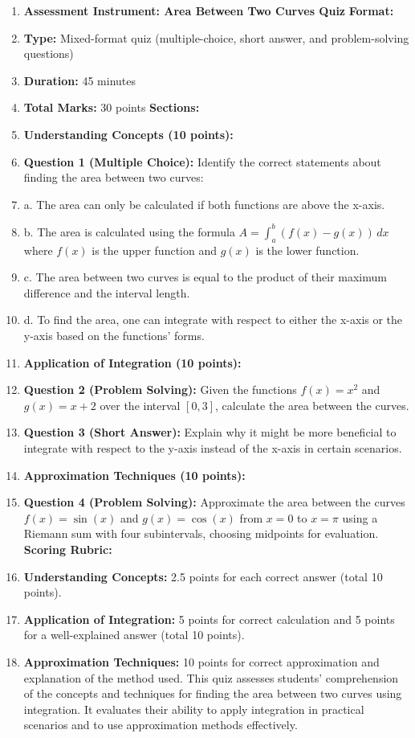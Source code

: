 \begin{enumerate}
    \item \textbf{Assessment Instrument: Area Between Two Curves Quiz} \textbf{Format:}
    \item \textbf{Type:} Mixed-format quiz (multiple-choice, short answer, and problem-solving questions)
    \item \textbf{Duration:} 45 minutes
    \item \textbf{Total Marks:} 30 points \textbf{Sections:}
    \item \textbf{Understanding Concepts (10 points):}
    \item \textbf{Question 1 (Multiple Choice):} Identify the correct statements about finding the area between two curves:
    \item a. The area can only be calculated if both functions are above the x-axis.
    \item b. The area is calculated using the formula $A = \int_a^b (f(x) - g(x)) \, dx$ where $f(x)$ is the upper function and $g(x)$ is the lower function.
    \item c. The area between two curves is equal to the product of their maximum difference and the interval length.
    \item d. To find the area, one can integrate with respect to either the x-axis or the y-axis based on the functions' forms.
    \item \textbf{Application of Integration (10 points):}
    \item \textbf{Question 2 (Problem Solving):} Given the functions $f(x) = x^2$ and $g(x) = x + 2$ over the interval $[0,3]$, calculate the area between the curves.
    \item \textbf{Question 3 (Short Answer):} Explain why it might be more beneficial to integrate with respect to the y-axis instead of the x-axis in certain scenarios.
    \item \textbf{Approximation Techniques (10 points):}
    \item \textbf{Question 4 (Problem Solving):} Approximate the area between the curves $f(x) = \sin(x)$ and $g(x) = \cos(x)$ from $x = 0$ to $x = \pi$ using a Riemann sum with four subintervals, choosing midpoints for evaluation. \textbf{Scoring Rubric:}
    \item \textbf{Understanding Concepts:} 2.5 points for each correct answer (total 10 points).
    \item \textbf{Application of Integration:} 5 points for correct calculation and 5 points for a well-explained answer (total 10 points).
    \item \textbf{Approximation Techniques:} 10 points for correct approximation and explanation of the method used. This quiz assesses students' comprehension of the concepts and techniques for finding the area between two curves using integration. It evaluates their ability to apply integration in practical scenarios and to use approximation methods effectively.
\end{enumerate}

